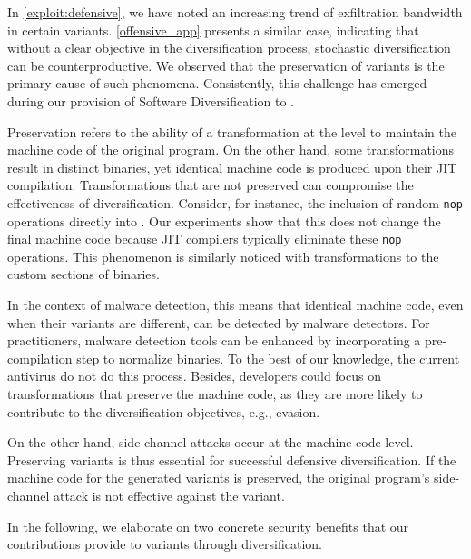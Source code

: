 \label{exploit:discussion_bad}

In \autoref{exploit:defensive}, we have noted an increasing trend of exfiltration bandwidth in certain variants. 
\autoref{offensive_app} presents a similar case, indicating that without a clear objective in the diversification process, stochastic diversification can be counterproductive. 
We observed that the preservation of variants is the primary cause of such phenomena. 
Consistently, this challenge has emerged during our provision of Software Diversification to \Wasm.

Preservation refers to the ability of a transformation at the \Wasm level to maintain the machine code of the original \Wasm program.
On the other hand, some transformations result in distinct \Wasm binaries, yet identical machine code is produced upon their JIT compilation.
Transformations that are not preserved can compromise the effectiveness of diversification.
Consider, for instance, the inclusion of random \texttt{nop} operations directly into \Wasm. 
Our experiments show that this does not change the final machine code because JIT compilers typically eliminate these \texttt{nop} operations.
This phenomenon is similarly noticed with transformations to the custom sections of \Wasm binaries.

In the context of \Wasm malware detection, this means that identical machine code, even when their \Wasm variants are different, can be detected by malware detectors.
For practitioners, malware detection tools can be enhanced by incorporating a pre-compilation step to normalize \Wasm binaries.
To the best of our knowledge, the current antivirus do not do this process.
Besides, developers could focus on transformations that preserve the machine code, as they are more likely to contribute to the diversification objectives, e.g., evasion.

On the other hand, side-channel attacks occur at the machine code level. 
Preserving \Wasm variants is thus essential for successful defensive diversification. 
If the machine code for the generated variants is preserved, the original \Wasm program's side-channel attack is not effective against the variant.

\label{exploit:discussion_good}

In the following, we elaborate on two concrete security benefits that our contributions provide to \Wasm variants through diversification.
 
